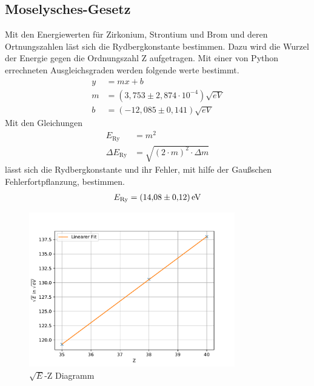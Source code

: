 \subsection{Moselysches-Gesetz}
Mit den Energiewerten für Zirkonium, Strontium und Brom und deren Ortnungszahlen läst sich die  Rydbergkonstante bestimmen.
Dazu wird die Wurzel der Energie gegen die Ordnungszahl Z aufgetragen.
Mit einer von Python errechneten Ausgleichsgraden werden folgende werte bestimmt.
\begin{align*}
  y&=mx+b\\
  m&=(3,753\pm2,874\cdot10^{-4})\si{\sqrt{eV}}\\
  b&=(-12,085\pm0,141)\si{\sqrt{eV}}
\end{align*}
Mit den Gleichungen
\begin{align*}
  E_{\text{Ry}}&=m^2\\
  \Delta E_{\text{Ry}}&=\sqrt{(2\cdot m)^2\cdot\Delta m}
\end{align*}
lässt sich die Rydbergkonstante und ihr Fehler, mit hilfe der Gaußschen Fehlerfortpflanzung, bestimmen.
\begin{align*}
  E_{\text{Ry}}=\SI{14,08\pm0,12}{eV}
\end{align*}
\begin{figure}[h!]
  \centering
  \includegraphics[width=0.8\textwidth]{ZgE.pdf}
  \caption{$\sqrt{E}$-Z Diagramm}
  \label{fig:ZgE}
\end{figure}
\FloatBarrier

